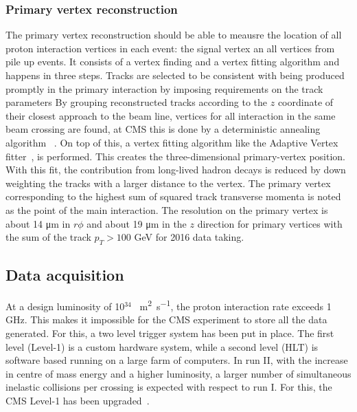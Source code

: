 \subsubsection*{Primary vertex reconstruction}
The primary vertex reconstruction should be able to meausre the location of all proton interaction vertices in each event: the signal vertex an all vertices from pile up events. 
It consists of a vertex finding and a vertex fitting algorithm and happens in three steps. Tracks are selected  to be consistent with being produced promptly in the primary interaction by imposing requirements on the track parameters\cite{Chatrchyan:1704291} By grouping reconstructed tracks according to the $z$ coordinate of their closest approach to the beam line, vertices for all interaction in the same beam crossing are found, at CMS this is done by a deterministic annealing algorithm~\cite{726788} . On top of this, a vertex fitting algorithm like the Adaptive Vertex fitter~\cite{Waltenberger:1166320}, is performed. This creates the three-dimensional primary-vertex position. With this fit, the contribution from long-lived hadron decays is reduced by down weighting the tracks with a larger distance to the vertex. The primary vertex corresponding to the highest sum of squared track transverse momenta is noted as the point of the main interaction. The resolution on the primary vertex is about 14 \si{ \micro \meter} in $r\phi$ and about 19 \si{ \micro \meter} in the $z$ direction for primary vertices with the sum of the track $p_T > 100$ \si{ \GeV} for 2016 data taking.
\subsection{Data acquisition}
At a design luminosity of 10$^{34}$ \si{ \per \square \meter \per \second}, the proton interaction rate exceeds 1 \si{ \giga \hertz}. This makes it impossible for the CMS experiment to store all the data generated. For this, a two level trigger system has been put in place. The first level (Level-1) is a custom hardware system, while a second level (HLT) is software based running on a large farm of computers. 
In run II, with the increase in centre of mass energy and a higher luminosity, a larger number of simultaneous inelastic collisions per crossing is expected with respect to run I. For this, the CMS Level-1 has been upgraded~\cite{1748-0221-12-03-C03021}. 

